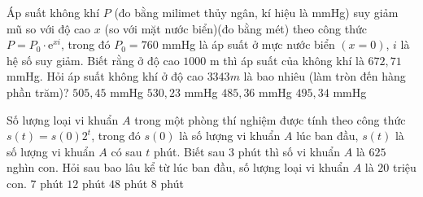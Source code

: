 \begin{ex}%
    Áp suất không khí $ P$ (đo bằng milimet thủy ngân, kí hiệu là mmHg) suy giảm mũ so với độ cao $ x$ (so với mặt nước biển)(đo bằng mét) theo công thức $ P=P_0\cdot \mathrm{e}^{xi}$, trong đó $P_0=760$ mmHg là áp suất ở mực nước biển $(x=0)$, $ i$ là hệ số suy giảm. Biết rằng ở độ cao $ 1000$ m thì áp suất của không khí là $ 672{,}71$ mmHg. Hỏi áp suất không khí ở độ cao $ 3343{m}$ là bao nhiêu (làm tròn đến hàng phần trăm)?
    \choice
    {\True $ 505{,}45$ mmHg}
    {$ 530{,}23$ mmHg}
    {$ 485{,}36$ mmHg}
    {$ 495{,}34$ mmHg}
\end{ex}
\begin{ex}%
    Số lượng loại vi khuẩn $ A$ trong một phòng thí nghiệm được tính theo công thức $ s(t)=s(0){2^t}$, trong đó $ s(0)$ là số lượng vi khuẩn $ A$ lúc ban đầu, $ s(t)$ là số lượng vi khuẩn $ A$ có sau $ t$ phút. Biết sau $3$ phút thì số vi khuẩn $ A$ là $625$ nghìn con. Hỏi sau bao lâu kể từ lúc ban đầu, số lượng loại vi khuẩn $ A$ là $20$ triệu con.
    \choice
    {$7$ phút}
    {$12$ phút}
    {$48$ phút}
    {\True $8$ phút}
\end{ex}
